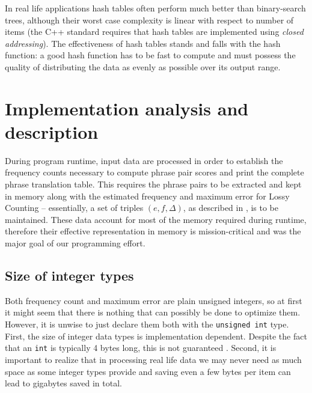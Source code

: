 In real life applications hash tables often perform much better than binary-search
trees, although their worst case complexity is linear with respect to number of items
(the C++ standard requires that hash tables are implemented using
\emph{closed addressing}).
The effectiveness of hash tables stands and falls with the hash function:
a good hash function has to be fast to compute and must possess the quality of distributing
the data as evenly as possible over its output range.

\section{Implementation analysis and description}

During program runtime, input data are processed in order to establish the frequency counts
necessary to compute phrase pair scores and print the complete phrase translation table.
This requires the phrase pairs to be extracted and kept in memory along with the estimated
frequency and maximum error for Lossy Counting -- essentially, a set of triples $(e, f, \Delta)$,
as described in , is to be maintained.
These data account for most of the memory required during runtime, therefore their effective
representation in memory is mission-critical and was the major goal of our programming effort.

\subsection{Size of integer types}

Both frequency count and maximum error are plain unsigned integers, so at first it might seem
that there is nothing that can possibly be done to optimize them.
However, it is unwise to just declare them both with the \texttt{unsigned int} type.
First, the size of integer data types is implementation dependent.
Despite the fact that an \texttt{int} is typically 4 bytes long, this is not guaranteed \citep[Chapter 4.6]{stroustrup:cplusplus}.
Second, it is important to realize that in processing real life data we may never need as much
space as some integer types provide and saving even a few bytes per item can lead to gigabytes
saved in total.

